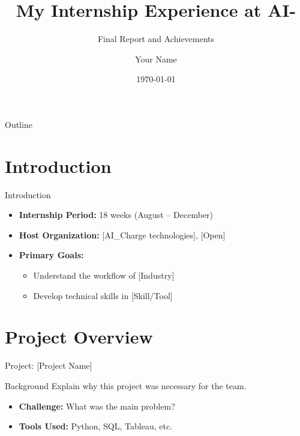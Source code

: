\documentclass[11pt]{beamer}
\title[Internship Presentation]{My Internship Experience at AI-}
\subtitle{Final Report and Achievements}
\author{Your Name}
\institute{University Name / Department}
\date{\today}
\begin{document}
    \begin{frame}
        \titlepage
    \end{frame}

    \begin{frame}{Outline}
        \tableofcontents
    \end{frame}

    \section{Introduction}
    \begin{frame}{Introduction}
        \begin{itemize}
            \item \textbf{Internship Period:} 18 weeks (August -- December)
            \item \textbf{Host Organization:} [AI_Charge technologies], [Open]
            \item \textbf{Primary Goals:}
            \begin{itemize}
                \item Understand the workflow of [Industry]
                \item Develop technical skills in [Skill/Tool]
            \end{itemize}
        \end{itemize}
    \end{frame}

    \section{Project Overview}
    \begin{frame}{Project: [Project Name]}
        \begin{block}{Background}
            Explain why this project was necessary for the team.
        \end{block}
        \begin{itemize}
            \item \textbf{Challenge:} What was the main problem?
            \item \textbf{Tools Used:} Python, SQL, Tableau, etc.
        \end{itemize}
    \end{frame}

\end{document}
